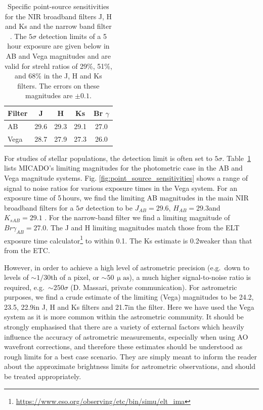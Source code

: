 \begin{table}

    \centering
    \caption{Specific point-source sensitivities for the NIR broadband filters J, H and Ks and the narrow band filter \brgamma.
    The $5\sigma$ detection limits of a 5 hour exposure are given below in AB and Vega magnitudes and are valid for strehl ratios of 29\%, 51\%, and 68\% in the J, H and Ks filters.
    The errors on these magnitudes are $\pm 0.1$\m.}
    \label{tbl:micado_point_source_sensitivities}

    \begin{tabular}{ l | c c c c }
        \hline\hline
Filter          & J         & H        & Ks         & Br $\gamma$   \\
        \hline                
    AB          & 29.6\m    & 29.3\m   & 29.1\m     & 27.0\m        \\
        \hline                
    Vega        & 28.7\m    & 27.9\m   & 27.3\m     & 26.0\m        \\
        \hline                
    \end{tabular}

\end{table}


For studies of stellar populations, the detection limit is often set to $5\sigma$.
Table~\ref{tbl:micado_point_source_sensitivities} lists MICADO's limiting magnitudes for the photometric case in the AB and Vega magnitude systems.
Fig. \ref{fig:point_source_sensitivities} shows a range of signal to noise ratios for various exposure times in the Vega system.
For an exposure time of 5\,hours, we find the limiting AB magnitudes in the main NIR broadband filters for a $5\sigma$ detection to be $J_{AB}=29.6$\m, $H_{AB}=29.3$\m and $K_{s  AB}=29.1$\m
. For the narrow-band filter \brgamma we find a limiting magnitude of $Br\gamma_{AB}=27.0$\m.
The J and H limiting magnitudes match those from the ELT exposure time calculator\footnote{\url{https://www.eso.org/observing/etc/bin/simu/elt_ima}} to within 0.1\m.
The Ks estimate is 0.2\m weaker than that from the ETC.

However, in order to achieve a high level of astrometric precision (e.g.\ down to levels of $\sim 1/30$th of a pixel, or $\sim 50\,\upmu\mathrm{as}$), a much higher signal-to-noise ratio is required, e.g.\ $\sim 250\sigma$ (D. Massari, private communication).
For astrometric purposes, we find a crude estimate of the limiting (Vega) magnitudes to be 24.2\m, 23.5\m, 22.9\m in J, H and Ks filters and 21.7\m in the \brgamma filter.
Here we have used the Vega system as it is more common within the astrometric community.
It should be strongly emphasised that there are a variety of external factors which heavily influence the accuracy of astrometric measurements, especially when using AO wavefront corrections, and therefore these estimates should be understood as rough limits for a best case scenario.
They are simply meant to inform the reader about the approximate brightness limits for astrometric observations, and should be treated appropriately.

